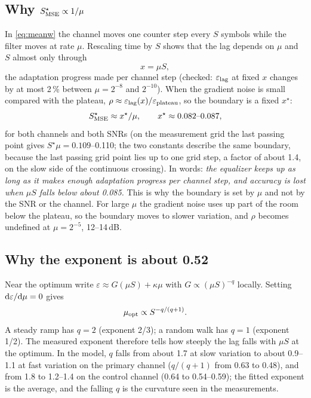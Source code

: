 \begin{newtext}
\subsection{Why $S^\star_{\rm MSE}\propto1/\mu$}
In \eqref{eq:meanw} the channel moves one counter step every $S$ symbols while the filter moves at rate $\mu$. Rescaling time by $S$ shows that the lag depends on $\mu$ and $S$ almost only through
\begin{equation}
x=\mu S,
\label{eq:x}
\end{equation}
the adaptation progress made per channel step (checked: $\varepsilon_{\rm lag}$ at fixed $x$ changes by at most 2\,\% between $\mu=2^{-8}$ and $2^{-10}$). When the gradient noise is small compared with the plateau, $\rho\approx\varepsilon_{\rm lag}(x)/\varepsilon_{\rm plateau}$, so the boundary is a fixed $x^\star$:
\begin{equation}
S^\star_{\rm MSE}\approx x^\star/\mu,\qquad x^\star\approx0.082\text{--}0.087,
\label{eq:law}
\end{equation}
for both channels and both SNRs (on the measurement grid the last passing point gives $S^\star\mu=0.109$--0.110; the two constants describe the same boundary, because the last passing grid point lies up to one grid step, a factor of about 1.4, on the slow side of the continuous crossing). In words: \emph{the equalizer keeps up as long as it makes enough adaptation progress per channel step, and accuracy is lost when $\mu S$ falls below about 0.085.} This is why the boundary is set by $\mu$ and not by the SNR or the channel. For large $\mu$ the gradient noise uses up part of the room below the plateau, so the boundary moves to slower variation, and $\rho$ becomes undefined at $\mu=2^{-5}$, 12--14\,dB.

\subsection{Why the exponent is about 0.52}
Near the optimum write $\varepsilon\approx G(\mu S)+\kappa\mu$ with $G\propto(\mu S)^{-q}$ locally. Setting ${\rm d}\varepsilon/{\rm d}\mu=0$ gives
\begin{equation}
\mu_{\rm opt}\propto S^{-q/(q+1)}.
\label{eq:qrule}
\end{equation}
A steady ramp has $q=2$ (exponent 2/3); a random walk has $q=1$ (exponent 1/2). The measured exponent therefore tells how steeply the lag falls with $\mu S$ at the optimum. In the model, $q$ falls from about 1.7 at slow variation to about 0.9--1.1 at fast variation on the primary channel ($q/(q+1)$ from 0.63 to 0.48), and from 1.8 to 1.2--1.4 on the control channel (0.64 to 0.54--0.59); the fitted exponent is the average, and the falling $q$ is the curvature seen in the measurements.


\end{newtext}
